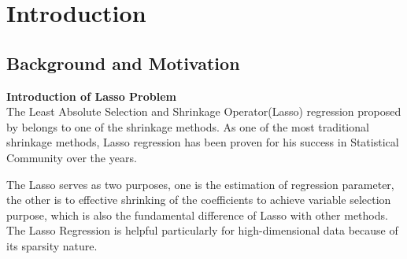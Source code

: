 \chapter{Introduction}
\label{Chapter1}
\section{Background and Motivation}




\textbf{Introduction of Lasso Problem}\\
The Least Absolute Selection and Shrinkage Operator(Lasso) regression proposed by \cite{tibshirani_1996} belongs to one of the shrinkage methods. As one of the most traditional shrinkage methods, Lasso regression has been proven for his success in Statistical Community over the years.

The Lasso serves as two purposes, one is the estimation of regression parameter, the other is to effective shrinking of the coefficients to achieve variable selection purpose, which is also the fundamental difference of Lasso with other methods. The Lasso Regression is helpful particularly for high-dimensional data because of its sparsity nature.

